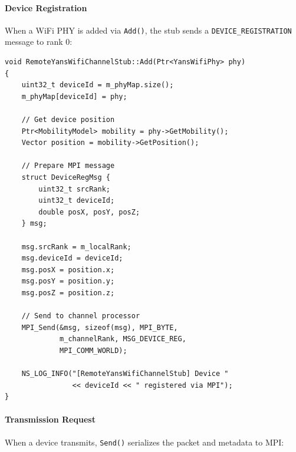 \paragraph{Device Registration}
When a WiFi PHY is added via \texttt{Add()}, the stub sends a \texttt{DEVICE\_REGISTRATION} message to rank 0:

\begin{lstlisting}[style=cpp, caption={Device registration flow}]
void RemoteYansWifiChannelStub::Add(Ptr<YansWifiPhy> phy)
{
    uint32_t deviceId = m_phyMap.size();
    m_phyMap[deviceId] = phy;
    
    // Get device position
    Ptr<MobilityModel> mobility = phy->GetMobility();
    Vector position = mobility->GetPosition();
    
    // Prepare MPI message
    struct DeviceRegMsg {
        uint32_t srcRank;
        uint32_t deviceId;
        double posX, posY, posZ;
    } msg;
    
    msg.srcRank = m_localRank;
    msg.deviceId = deviceId;
    msg.posX = position.x;
    msg.posY = position.y;
    msg.posZ = position.z;
    
    // Send to channel processor
    MPI_Send(&msg, sizeof(msg), MPI_BYTE,
             m_channelRank, MSG_DEVICE_REG,
             MPI_COMM_WORLD);
             
    NS_LOG_INFO("[RemoteYansWifiChannelStub] Device " 
                << deviceId << " registered via MPI");
}
\end{lstlisting}

\paragraph{Transmission Request}
When a device transmits, \texttt{Send()} serializes the packet and metadata to MPI:

